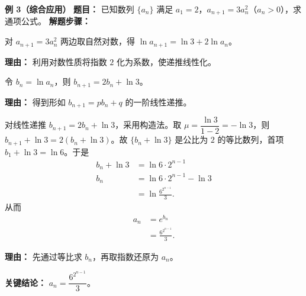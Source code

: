\begin{examplebox}
	\medskip
	\textbf{\textcolor{CExample}{例 3（综合应用）}}
	\textbf{\textcolor{CExample}{题目：}}
	已知数列 $\{a_n\}$ 满足 $a_1=2$，$a_{n+1}=3a_n^2$（$a_n>0$），求通项公式。
	\textbf{\textcolor{CExample}{解题步骤：}}
	\begin{description}[style=nextline,leftmargin=2.8em,labelsep=0.5em,itemsep=0.45em]
		\item[\textbf{第一步（取对数降次）：}]
			对 $a_{n+1}=3a_n^2$ 两边取自然对数，得 $\ln a_{n+1} = \ln3 + 2\ln a_n$。
			\par\textbf{理由：} 利用对数性质将指数 $2$ 化为系数，使递推线性化。
		\item[\textbf{第二步（变量代换线性化）：}]
			令 $b_n = \ln a_n$，则 $b_{n+1} = 2b_n + \ln3$。
			\par\textbf{理由：} 得到形如 $b_{n+1}=p b_n+q$ 的一阶线性递推。
		\item[\textbf{第三步（构造等比求通项）：}]
			对线性递推 $b_{n+1}=2b_n+\ln3$，采用构造法。取 $\mu = \dfrac{\ln3}{1-2} = -\ln3$，则 $b_{n+1}+\ln3 = 2(b_n+\ln3)$。故 $\{b_n+\ln3\}$ 是公比为 $2$ 的等比数列，首项 $b_1+\ln3 = \ln6$。于是
			\[
				\begin{aligned}
					b_n+\ln3 &= \ln6\cdot2^{n-1} \\ b_n &= \ln6\cdot2^{n-1} - \ln3 \\ &= \ln\frac{6^{2^{n-1}}}{3}.
			\end{aligned}
			\]
			从而
			\[
				\begin{aligned}
					a_n &= e^{b_n} \\ &= \frac{6^{2^{n-1}}}{3}.
			\end{aligned}
			\]
			\par\textbf{理由：} 先通过等比求 $b_n$，再取指数还原为 $a_n$。
	\end{description}
	\textbf{\textcolor{CExample}{关键结论：}}
	\textbf{$a_n = \dfrac{6^{2^{n-1}}}{3}$}。
\end{examplebox}
